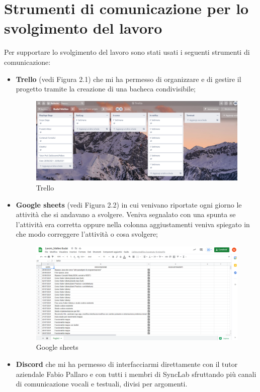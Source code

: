 \section{Strumenti di comunicazione per lo svolgimento del lavoro}
Per supportare lo svolgimento del lavoro sono stati usati i seguenti strumenti di comunicazione:
\begin{itemize}
	\item \textbf{Trello} (vedi Figura 2.1) che mi ha permesso di organizzare e di gestire il progetto tramite la creazione di una bacheca condivisibile;
	\begin{figure}[htbp]	
		\centering
		\includegraphics[width=12cm]{immagini/trello.png}
		\caption{Trello}
		\label{fig:Trello}
	\end{figure}
	\item \textbf{Google sheets} (vedi Figura 2.2) in cui venivano riportate ogni giorno le attività che si andavano a svolgere. Veniva segnalato con una spunta se l'attività era corretta oppure nella colonna aggiustamenti veniva spiegato in che modo correggere l'attività o cosa svolgere;
	\begin{figure}[htbp]	
		\centering
		\includegraphics[width=12cm]{immagini/googlesheet.png}
		\caption{Google sheets}
		\label{fig:Google sheets}
	\end{figure}
	\item \textbf{Discord} che mi ha permesso di interfacciarmi direttamente
	con il tutor aziendale Fabio Pallaro e con tutti i membri di SyncLab sfruttando più canali di comunicazione vocali e testuali, divisi per argomenti.
\end{itemize}
	


